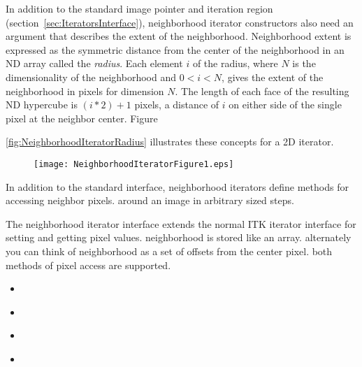 In addition to the standard image pointer and iteration region
(section~\ref{sec:IteratorsInterface}), neighborhood iterator constructors also
need an argument that describes the extent of the neighborhood.  Neighborhood
extent is expressed as the symmetric distance from the center of the
neighborhood in an ND array called the \emph{radius}. Each element $i$ of the
radius, where $N$ is the dimensionality of the neighborhood and $0 < i < N$,
gives the extent of the neighborhood in pixels for dimension $N$.  The length of
each face of the resulting ND hypercube is $(i * 2) + 1$ pixels, a distance of
$i$ on either side of the single pixel at the neighbor center.
Figure~{\ref{fig:NeighborhoodIteratorRadius} illustrates these concepts for a
2D iterator.

\begin{figure}
\centering
\texttt{[image: NeighborhoodIteratorFigure1.eps]}
\protect\label{fig:WalkingNeighborhoodIterator}
\end{figure}

In addition to the standard interface, neighborhood iterators define methods
for accessing neighbor pixels.  
around an image in arbitrary sized steps.






The neighborhood iterator interface extends the normal ITK iterator interface
for setting and getting pixel values.  neighborhood is stored like an array.
alternately you can think of neighborhood as a set of offsets from the center
pixel.  both methods of pixel access are supported.

\begin{itemize}
\item \textbf{} 
\item \textbf{} 

\item \textbf{} 
\item \textbf{} 


\end{itemize}}
